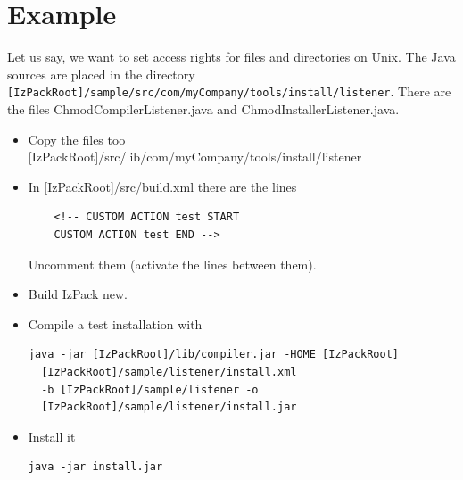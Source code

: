 \section{Example}
Let us say, we want to set access rights for files and directories
on Unix. The Java sources are placed in the directory \\
\texttt{[IzPackRoot]/sample/src/com/myCompany/tools/install/listener}.
There are the files ChmodCompilerListener.java and
ChmodInstallerListener.java.
\begin{itemize}
  \item Copy the files too
  [IzPackRoot]/src/lib/com/myCompany/tools/install/listener
  \item In [IzPackRoot]/src/build.xml there are the lines
\footnotesize
\begin{verbatim}
    <!-- CUSTOM ACTION test START
    CUSTOM ACTION test END -->
\end{verbatim}
\normalsize Uncomment them (activate the lines between them).
  \item Build IzPack new.
  \item Compile a test installation with
\footnotesize
\begin{verbatim}
java -jar [IzPackRoot]/lib/compiler.jar -HOME [IzPackRoot]
  [IzPackRoot]/sample/listener/install.xml
  -b [IzPackRoot]/sample/listener -o
  [IzPackRoot]/sample/listener/install.jar
\end{verbatim}
\normalsize
  \item Install it
\footnotesize
\begin{verbatim}
java -jar install.jar
\end{verbatim}
\normalsize
\end{itemize}\
